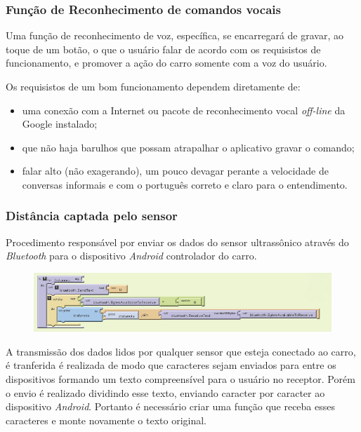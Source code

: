 \documentclass[portugues, brazil, a4paper,12pt]{article}
\begin{document}
\subsubsection{Função de Reconhecimento de comandos vocais}
Uma função de reconhecimento de voz, específica, se encarregará de gravar, ao toque de um botão, o que o usuário falar de acordo com os requisistos de funcionamento, e promover a ação do carro somente com a voz do usuário.

Os requisistos de um bom funcionamento dependem diretamente de:

\begin{itemize}
	\item uma conexão com a Internet ou pacote de reconhecimento vocal \textit{off-line} da Google instalado;
	\item que não haja barulhos que possam atrapalhar o aplicativo gravar o comando;
	\item falar alto (não exagerando), um pouco devagar perante a velocidade de conversas informais e com o português correto e claro para o entendimento.
\end{itemize}



\subsubsection{Distância captada pelo sensor}
Procedimento responsável por enviar os dados do sensor ultrassônico através do \textit{Bluetooth} para o dispositivo \textit{Android} controlador do carro\cite{bt}.

\begin{figure}[H]
	\centering
	\includegraphics[scale=.7]{img/controle/distancia.png}
	
\end{figure}
A transmissão dos dados lidos por qualquer sensor que esteja conectado ao carro, é tranferida é realizada de modo que caracteres sejam enviados para entre os dispositivos formando um texto compreensível para o usuário no receptor. Porém o envio é realizado dividindo esse texto, enviando caracter por caracter ao dispositivo \textit{Android}. Portanto é necessário criar uma função que receba esses caracteres e monte novamente o texto original.
\end{document}
